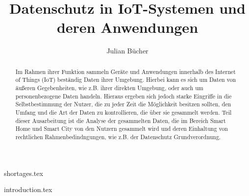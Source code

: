 \documentclass[runningheads]{llncs}
\begin{document}

\title{Datenschutz in IoT-Systemen und deren Anwendungen}
%
%
\author{Julian Bücher}
%
%
%
\maketitle              %


\begin{abstract}
Im Rahmen ihrer Funktion sammeln Geräte und Anwendungen innerhalb des Internet of Things (IoT) beständig Daten ihrer Umgebung. Hierbei kann es sich um Daten von äußeren Gegebenheiten, wie z.B. ihrer direkten Umgebung, oder auch um personenbezogene Daten handeln. Hieraus ergeben sich jedoch starke Eingriffe in die Selbstbestimmung der Nutzer, die zu jeder Zeit die Möglichkeit besitzen sollten, den Umfang und die Art der Daten zu kontrollieren, die über sie gesammelt werden. Teil dieser Ausarbeitung ist die Analyse der gesammelten Daten, die im Bereich Smart Home und Smart City von den Nutzern gesammelt wird und deren Einhaltung von rechtlichen Rahmenbedindngungen, wie z.B. der Datenschutz Grundverordnung.

\end{abstract}


\newpage

{shortages.tex}

\newpage

{introduction.tex}


\newpage

\printbibliography

\end{document}
